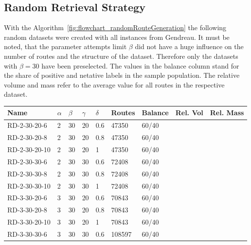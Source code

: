 \subsection{Random Retrieval Strategy}
With the Algorithm~\ref{fig:flowchart_randomRouteGeneration} the following random datasets were created with all
instances from Gendreau. It must be noted, that the parameter attempts limit $\beta$ did not have a huge influence on
the number of routes and the structure of the dataset. Therefore only the datasets with $\beta = 30$ have been preselected.
The values in the balance column stand for the share of positive and netative labels in the sample population. The relative volume
and mass refer to the average value for all routes in the respective dataset.
\begin{table}[h!]
    \centering
    \begin{tabular}{@{}L{0.17\textwidth}P{0.04\textwidth}P{0.04\textwidth}P{0.04\textwidth}P{0.05\textwidth}P{0.09\textwidth}P{0.10\textwidth}P{0.12\textwidth}P{0.12\textwidth}@{}}
        \toprule
        Name          & $\alpha$ & $\beta$ & $\gamma$ & $\delta$ & Routes & Balance & Rel. Vol & Rel. Mass \\
        \midrule
        RD-2-30-20-6  & 2        & 30      & 20       & 0.6      & 47350  & 60/40   &          &           \\
        RD-2-30-20-8  & 2        & 30      & 20       & 0.8      & 47350  & 60/40   &          &           \\
        RD-2-30-20-10 & 2        & 30      & 20       & 1        & 47350  & 60/40   &          &           \\
        RD-2-30-30-6  & 2        & 30      & 30       & 0.6      & 72408  & 60/40   &          &           \\
        RD-2-30-30-8  & 2        & 30      & 30       & 0.8      & 72408  & 60/40   &          &           \\
        RD-2-30-30-10 & 2        & 30      & 30       & 1        & 72408  & 60/40   &          &           \\
        RD-3-30-20-6  & 3        & 30      & 20       & 0.6      & 70843  & 60/40   &          &           \\
        RD-3-30-20-8  & 3        & 30      & 20       & 0.8      & 70843  & 60/40   &          &           \\
        RD-3-30-20-10 & 3        & 30      & 20       & 1        & 70843  & 60/40   &          &           \\
        RD-3-30-30-6  & 3        & 30      & 30       & 0.6      & 108597 & 60/40   &          &           \\

\end{tabular}
\end{table}
